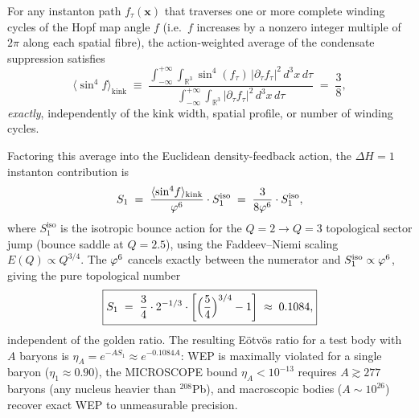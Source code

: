

\begin{proposition}
\label{P5:prop:kink_avg}
For any instanton path $f_\tau(\mathbf{x})$ that traverses one or more
complete winding cycles of the Hopf map angle $f$ (i.e.\ $f$ increases
by a nonzero integer multiple of $2\pi$ along each spatial fibre), the
action-weighted average of the condensate suppression satisfies
\begin{equation}
  \langle\sin^4\!f\rangle_{\mathrm{kink}}
  \;\equiv\;
  \frac{\displaystyle\int_{-\infty}^{+\infty}\!\!
    \int_{\mathbb{R}^3}\sin^4(f_\tau)\,|\partial_\tau f_\tau|^2
          \,d^3x\,d\tau}
       {\displaystyle\int_{-\infty}^{+\infty}\!\!
    \int_{\mathbb{R}^3}|\partial_\tau f_\tau|^2
          \,d^3x\,d\tau}
  \;=\; \frac{3}{8},
  \label{P5:eq:kink_avg}
\end{equation}
\emph{exactly}, independently of the kink width, spatial profile, or
number of winding cycles.

Factoring this average into the Euclidean density-feedback action, the
$\Delta H=1$ instanton contribution is
\begin{equation}
  S_1
  \;=\; \frac{\langle\sin^4\!f\rangle_{\mathrm{kink}}}{\varphi^6}\cdot S_1^{\mathrm{iso}}
  \;=\; \frac{3}{8\varphi^6}\cdot S_1^{\mathrm{iso}},
\end{equation}
where $S_1^{\mathrm{iso}}$ is the isotropic bounce action for the
$Q=2\to Q=3$ topological sector jump (bounce saddle at $Q=2.5$), using
the Faddeev--Niemi scaling $E(Q)\propto Q^{3/4}$. The $\varphi^6$ cancels
exactly between the numerator and $S_1^{\mathrm{iso}}\propto\varphi^6$,
giving the pure topological number
\begin{equation}
  \boxed{S_1
  \;=\; \frac{3}{4}\cdot 2^{-1/3}
        \cdot\left[\Bigl(\frac{5}{4}\Bigr)^{3/4}-1\right]
  \;\approx\; 0.1084,}
\end{equation}
independent of the golden ratio. The resulting E\"otv\"os ratio for a
test body with $A$ baryons is $\eta_A=e^{-AS_1}\approx e^{-0.1084A}$:
WEP is maximally violated for a single baryon ($\eta_1\approx0.90$),
the MICROSCOPE bound $\eta_A<10^{-13}$ requires $A\gtrsim277$ baryons
(any nucleus heavier than $^{208}$Pb), and macroscopic bodies
($A\sim10^{26}$) recover exact WEP to unmeasurable precision.
\end{proposition}
